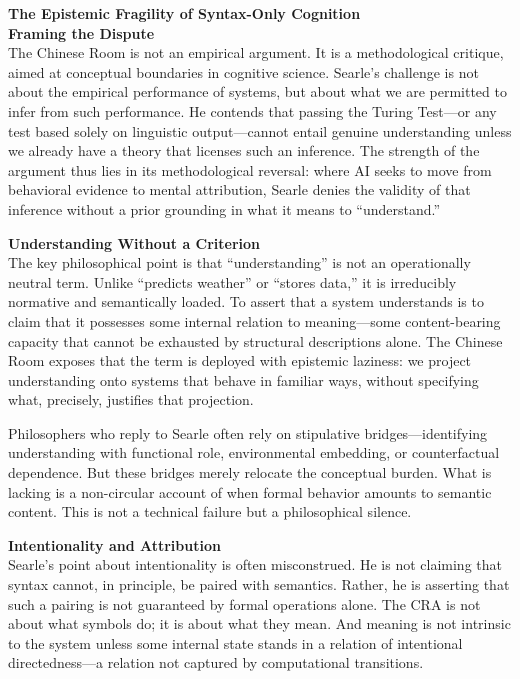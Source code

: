 \begin{technical}
{\Large\textbf{The Epistemic Fragility of Syntax-Only Cognition}}\\[0.7em]

\noindent\textbf{Framing the Dispute}\\[0.5em]
The Chinese Room is not an empirical argument. It is a methodological critique, aimed at conceptual boundaries in cognitive science. Searle's challenge is not about the empirical performance of systems, but about what we are permitted to infer from such performance. He contends that passing the Turing Test—or any test based solely on linguistic output—cannot entail genuine understanding unless we already have a theory that licenses such an inference. The strength of the argument thus lies in its methodological reversal: where AI seeks to move from behavioral evidence to mental attribution, Searle denies the validity of that inference without a prior grounding in what it means to “understand.”

\noindent\textbf{Understanding Without a Criterion}\\[0.5em]
The key philosophical point is that “understanding” is not an operationally neutral term. Unlike “predicts weather” or “stores data,” it is irreducibly normative and semantically loaded. To assert that a system understands is to claim that it possesses some internal relation to meaning—some content-bearing capacity that cannot be exhausted by structural descriptions alone. The Chinese Room exposes that the term is deployed with epistemic laziness: we project understanding onto systems that behave in familiar ways, without specifying what, precisely, justifies that projection.

Philosophers who reply to Searle often rely on stipulative bridges—identifying understanding with functional role, environmental embedding, or counterfactual dependence. But these bridges merely relocate the conceptual burden. What is lacking is a non-circular account of when formal behavior amounts to semantic content. This is not a technical failure but a philosophical silence.

\noindent\textbf{Intentionality and Attribution}\\[0.5em]
Searle’s point about intentionality is often misconstrued. He is not claiming that syntax cannot, in principle, be paired with semantics. Rather, he is asserting that such a pairing is not guaranteed by formal operations alone. The CRA is not about what symbols do; it is about what they mean. And meaning is not intrinsic to the system unless some internal state stands in a relation of intentional directedness—a relation not captured by computational transitions.


\end{technical}

